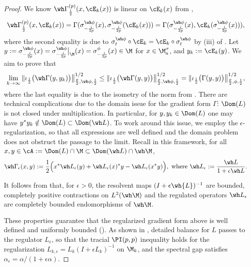 \documentclass[sn-mathphys-num]{sn-jnl}
\begin{document}
\begin{proof}
We know $\wh\Gamma_{\frac 12}^{(p)}(x,\cE_k(x))$ is linear on $\cE_k(x)$ from ,
\[
    \wh\Gamma_{\frac 12}^{(p)}(x,\cE_k(x))=\Gamma(\sigma^{\wh\phi}_{- \frac {i} {2p}}(x),\sigma^{\wh\phi}_{- \frac {i} {2p}}(\cE_k(x)))=\Gamma(\sigma^{\wh\phi}_{- \frac {i} {2p}}(x),\cE_k(\sigma^{\wh\phi}_{- \frac {i} {2p}}(x))),
\]
where the second equality is due to $      \sigma_t^{\wh\phi}\circ\cE_k = \cE_k\circ\sigma_t^{\wh\phi}$ by (iii) of . Let $y:=\sigma^{\wh\phi}_{- \frac {i} {2p}}(x)=\sigma^{\wh\phi}_{- \frac {i} {2p}}\bigl|_{\M}(x)=\sigma^{\phi}_{- \frac {i} {2p}}(x)\in\M$ for $x\in \M_a^\sigma$, and $y_k:=\cE_k(y)$. We aim to prove that
\begin{equation}\label{eq:gamma-pnorm}
    \lim_{k\to\infty}\|\iota_{\frac{1}{2}}\bigl(\wh\Gamma(y,y_k)\bigr)\bigr\|_{\frac{p}{2},\wh \phi,\frac 12}^{1/2}\le \|\iota_{\frac{1}{2}}\bigl(\wh\Gamma(y,y)\bigr)\bigr\|_{\frac{p}{2},\wh \phi,\frac 12}^{1/2}=\|\iota_{\frac{1}{2}}\bigl(\Gamma(y,y)\bigr)\bigr\|_{\frac{p}{2}, \phi,\frac 12}^{1/2},
\end{equation}
where the last equality is due to the isometry of the norm from .
There are technical complications due to the domain issue for the gradient form $\Gamma$: $\Dom(L)$ is not closed under multiplication.
In particular, for $y,y_k\in\Dom( L)$ one may have
$y^*y_k\notin\Dom(L)\subset \Dom({\wh L})$. To work around this issue, we employ the
$\epsilon$-regularization, so that all
expressions are well defined and the domain problem does not obstruct the passage to the limit. Recall in this framework, for all $x,y\in\cA:=\Dom( L)\cap \M\subset\Dom( \wh L)\cap \wh \M$,
\begin{equation}\label{eq:regulated-Gamma}
        \wh \Gamma_\epsilon(x,y)
 :=
\frac{1}{2}\Bigl(
x^*\wh L_\epsilon(y)+\wh L_\epsilon(x)^*y-\wh L_\epsilon(x^*y)
\Bigr), \text{ where } \wh L_\epsilon:=\frac{\wh L}{1+\epsilon \wh L}.
\end{equation}

It follows from \cite[Prop.~2.5]{cipriani_derivations_2003} that, for $\epsilon>0$, the resolvent maps $(I+\epsilon \wh{L})^{-1}$ are bounded, completely positive contractions on $L^2({\wh\M})$ and the regulated operators $ \wh L_\epsilon$
are completely bounded endomorphisms of $\wh \M$.

These properties guarantee that the regularized gradient form above is
well defined and uniformly bounded ().
As shown in , detailed balance for $L$ passes to the
regulator $L_\epsilon$, so that the tracial
$\PI(p,p)$ inequality holds for the regularization $ L_{k,\epsilon}={L_k}({I+\epsilon  L_k})^{-1}$ on $\M_k$, and the spectral gap satisfies
$\alpha_\epsilon ={\alpha}/ ({1+\epsilon\alpha})$.


\end{proof}
\end{document}
